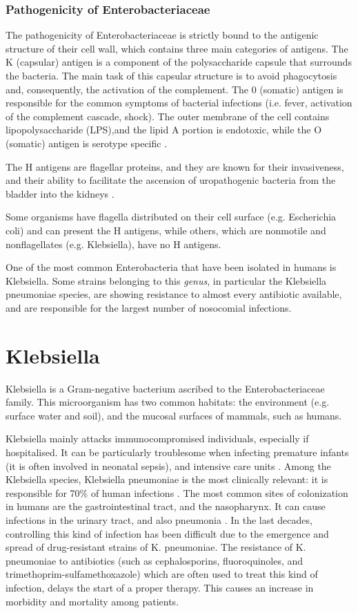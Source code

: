 \documentclass[11pt]{report}
\begin{document}
\subsubsection{Pathogenicity of Enterobacteriaceae}

The pathogenicity of Enterobacteriaceae is strictly bound to the antigenic structure of their cell wall, which contains three main categories of antigens.
The K (capsular) antigen is a component of the polysaccharide capsule that surrounds the bacteria.
The main task of this capsular structure is to avoid phagocytosis and, consequently, the activation of the complement.
The 0 (somatic) antigen is responsible for the common symptoms of bacterial infections (i.e. fever, activation of the complement cascade, shock).
The outer membrane of the cell contains lipopolysaccharide (LPS),and the lipid A portion is endotoxic, while the O (somatic) antigen is serotype specific \cite{guentzel1996escherichia}.

The H antigens are flagellar proteins, and they are known for their invasiveness, and their ability to facilitate the ascension of uropathogenic bacteria from the bladder into the kidneys \cite{wiles2008origins}.

Some organisms have flagella distributed on their cell surface (e.g. Escherichia coli) and can present the H antigens, while others, which are nonmotile and nonflagellates (e.g. Klebsiella), have no H antigens.

One of the most common Enterobacteria that have been isolated in humans is Klebsiella.
Some strains belonging to this \emph{genus}, in particular the Klebsiella pneumoniae species, are showing resistance to almost every antibiotic available, and are responsible for the largest number of nosocomial infections.

\section{Klebsiella}
Klebsiella is a Gram-negative bacterium ascribed to the Enterobacteriaceae family.
This microorganism has two common habitats: the environment (e.g. surface water and soil), and the mucosal surfaces of mammals, such as humans.

Klebsiella mainly attacks immunocompromised individuals, especially if hospitalised.
It can be particularly troublesome when infecting premature infants (it is often involved in neonatal sepsis), and intensive care units \cite{podschun1998klebsiella}.
Among the Klebsiella species, Klebsiella pneumoniae is the most clinically relevant: it is responsible for 70$\%$ of human infections \cite{Pitout2015}.
The most common sites of colonization in humans are the gastrointestinal tract, and the nasopharynx.
It can cause infections in the urinary tract, and also pneumonia \cite{Pitout2015, podschun1998klebsiella}.
In the last decades, controlling this kind of infection has been difficult due to the emergence and spread of drug-resistant strains of K. pneumoniae.
The resistance of K. pneumoniae to antibiotics (such as cephalosporins, fluoroquinoles, and trimethoprim-sulfamethoxazole) which are often used to treat this kind of infection, delays the start of a proper therapy.
This causes an increase in morbidity and mortality among patients.
\end{document}
